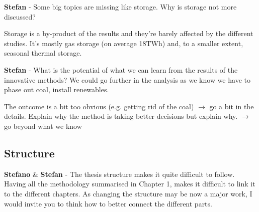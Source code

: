 \documentclass[12pt,a4paper]{article}
\begin{document}
\begin{mdframed}[style=manuscript] %

\end{mdframed}

\begin{mdframed}[style=comment] %
{\color{teal} \textbf{Stefan}} - Some big topics are missing like storage. Why is storage not more discussed? 
\end{mdframed}

\noindent Storage is a by-product of the results and they’re barely affected by the different studies. It’s mostly gas storage (on average 18TWh) and, to a smaller extent, seasonal thermal storage.

\begin{mdframed}[style=manuscript] %

\end{mdframed}

\begin{mdframed}[style=comment] %
{\color{teal} \textbf{Stefan}} - What is the potential of what we can learn from the results of the innovative methods? We could go further in the analysis as we know we have to phase out coal, install renewables.
\end{mdframed}

\noindent The outcome is a bit too obvious (e.g. getting rid of the coal) $\rightarrow$ go a bit in the details. Explain why the method is taking better decisions but explain why. $\rightarrow$ go beyond what we know

\begin{mdframed}[style=manuscript] %

\end{mdframed}

\subsection{Structure}
\label{structure}

\begin{mdframed}[style=comment] %
{\color{orange} \textbf{Stefano}} \& {\color{teal} \textbf{Stefan}} - The thesis structure makes it quite difficult to follow. Having all the methodology summarised in Chapter 1, makes it difficult to link it to the different chapters. As changing the structure may be now a major work, I would invite you to think how to better connect the different parts. 
\end{mdframed}
\end{document}
